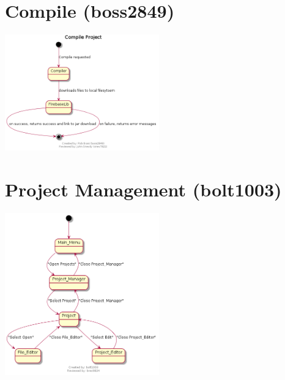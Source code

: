 \documentclass[11pt]{report}
\begin{document}
    \section{Compile (boss2849)}
        \begin{minipage}{1\textwidth}
            \begin{center}
                \includegraphics[width=0.5\textwidth]{diagrams/statechart-compile}
            \end{center}
        \end{minipage}
        
    \section{Project Management (bolt1003)}
        \begin{minipage}{1\textwidth}
            \begin{center}
                \includegraphics[width=0.5\textwidth]{diagrams/statechart-project_management}
            \end{center}
        \end{minipage}
        
\end{document}
